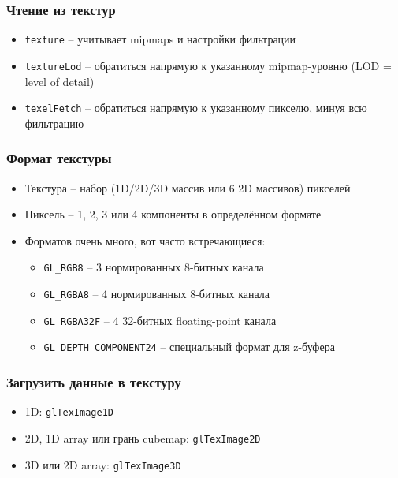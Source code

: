 \documentclass{beamer}
\begin{document}
\begin{frame}[fragile]
\frametitle{Чтение из текстур}
\begin{itemize}
\item \verb|texture| -- учитывает mipmaps и настройки фильтрации
\pause
\item \verb|textureLod| -- обратиться напрямую к указанному mipmap-уровню (LOD = level of detail)
\pause
\item \verb|texelFetch| -- обратиться напрямую к указанному пикселю, минуя всю фильтрацию
\end{itemize}
\end{frame}

\begin{frame}[fragile]
\frametitle{Формат текстуры}
\begin{itemize}
\item Текстура -- набор (1D/2D/3D массив или 6 2D массивов) пикселей
\pause
\item Пиксель -- 1, 2, 3 или 4 компоненты в определённом формате
\pause
\item Форматов очень много, вот часто встречающиеся:
\begin{itemize}
\item \verb|GL_RGB8| -- 3 нормированных 8-битных канала
\item \verb|GL_RGBA8| -- 4 нормированных 8-битных канала
\item \verb|GL_RGBA32F| -- 4 32-битных floating-point канала
\item \verb|GL_DEPTH_COMPONENT24| -- специальный формат для z-буфера
\end{itemize}
\end{itemize}
\end{frame}

\begin{frame}[fragile]
\frametitle{Загрузить данные в текстуру}
\begin{itemize}
\item 1D: \verb|glTexImage1D|
\pause
\item 2D, 1D array или грань cubemap: \verb|glTexImage2D|
\pause
\item 3D или 2D array: \verb|glTexImage3D|
\end{itemize}
\end{frame}
\end{document}
